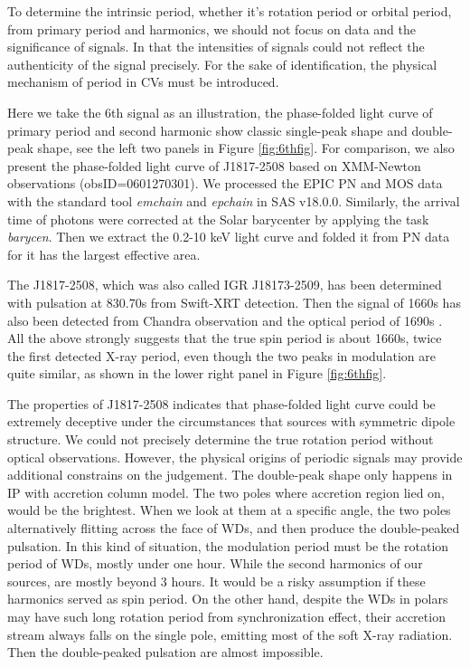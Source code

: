 \documentclass[twoside,twocolumn]{aastex63}
\begin{document}
To determine the intrinsic period, whether it's rotation period or orbital period, from primary period and harmonics, we should not focus on data and the significance of signals. In that the intensities of signals could not reflect the authenticity of the signal precisely. For the sake of  identification, the physical mechanism of period in CVs must be introduced. 

Here we take the 6th signal as an illustration, the phase-folded light curve of primary period and second harmonic show classic  single-peak shape and double-peak shape, see the left two panels in Figure \ref{fig:6thfig}. For comparison, we also present the phase-folded light curve of J1817-2508 based on XMM-Newton observations (obsID=0601270301).
We processed the EPIC PN and MOS data with the standard tool \emph{emchain} and \emph{epchain} in SAS v18.0.0. Similarly, the arrival time of photons were corrected at the Solar barycenter  by applying the task \emph{barycen}.
Then we extract the 0.2-10 keV light curve and folded it from PN data for it has the largest effective area.

 The J1817-2508, which was also called IGR J18173-2509, has been determined with pulsation at 830.70s from Swift-XRT detection. Then the signal of 1660s has also been detected from Chandra observation \citep{2009ATel.2354....1N} and the optical period of 1690s \citep{2012A&A...542A..22B}. All the above strongly suggests that the true spin period is about 1660s, twice the first detected X-ray period, even though the two peaks in modulation are quite similar, as shown in the lower right panel in Figure \ref{fig:6thfig}.
 
 The properties of J1817-2508 indicates that phase-folded light curve could be extremely deceptive under the circumstances that sources with symmetric dipole structure. We could not precisely determine the true rotation period without optical observations. However, the physical origins of periodic signals may provide additional constrains on the judgement. The double-peak shape only happens in IP with accretion column model. The two poles where accretion region lied on, would be the brightest. When we look at them at a specific angle, the two poles alternatively flitting across the face of WDs, and then produce the double-peaked pulsation. In this kind of situation, the modulation period must be the rotation period of WDs, mostly under one hour. While the second harmonics of our sources, are mostly beyond 3 hours. It would be a risky assumption if these harmonics served as spin period. On the other hand, despite the WDs in polars may have such long rotation period from synchronization effect, their accretion stream always falls on the single pole, emitting most of the soft X-ray radiation. Then the double-peaked pulsation are almost impossible. 
 
\end{document}
